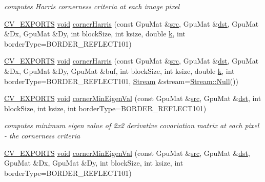\begin{DoxyCompactItemize}
\begin{DoxyCompactList}\small\item\em computes Harris cornerness criteria at each image pixel \end{DoxyCompactList}\item 
\hyperlink{core_2types__c_8h_a1bf9f0e121b54272da02379cfccd0a2b}{C\-V\-\_\-\-E\-X\-P\-O\-R\-T\-S} \hyperlink{legacy_8hpp_a8bb47f092d473522721002c86c13b94e}{void} \hyperlink{namespacecv_1_1gpu_a66cead98ee05fa752d6739124f47ba11}{corner\-Harris} (const Gpu\-Mat \&\hyperlink{legacy_8hpp_a371cd109b74033bc4366f584edd3dacc}{src}, Gpu\-Mat \&\hyperlink{photo__c_8h_aed13e2a25279b24dc954073233fef7a5}{dst}, Gpu\-Mat \&Dx, Gpu\-Mat \&Dy, int block\-Size, int ksize, double \hyperlink{legacy_8hpp_a7be9b6436e5ea72ff5d5a66779b4bd38}{k}, int border\-Type=B\-O\-R\-D\-E\-R\-\_\-\-R\-E\-F\-L\-E\-C\-T101)
\item 
\hyperlink{core_2types__c_8h_a1bf9f0e121b54272da02379cfccd0a2b}{C\-V\-\_\-\-E\-X\-P\-O\-R\-T\-S} \hyperlink{legacy_8hpp_a8bb47f092d473522721002c86c13b94e}{void} \hyperlink{namespacecv_1_1gpu_a495c842da58ec4756c58c004707a3f68}{corner\-Harris} (const Gpu\-Mat \&\hyperlink{legacy_8hpp_a371cd109b74033bc4366f584edd3dacc}{src}, Gpu\-Mat \&\hyperlink{photo__c_8h_aed13e2a25279b24dc954073233fef7a5}{dst}, Gpu\-Mat \&Dx, Gpu\-Mat \&Dy, Gpu\-Mat \&buf, int block\-Size, int ksize, double \hyperlink{legacy_8hpp_a7be9b6436e5ea72ff5d5a66779b4bd38}{k}, int border\-Type=B\-O\-R\-D\-E\-R\-\_\-\-R\-E\-F\-L\-E\-C\-T101, \hyperlink{classcv_1_1gpu_1_1Stream}{Stream} \&stream=\hyperlink{classcv_1_1gpu_1_1Stream_af96c23564834f88333dcb8997df553f1}{Stream\-::\-Null}())
\item 
\hyperlink{core_2types__c_8h_a1bf9f0e121b54272da02379cfccd0a2b}{C\-V\-\_\-\-E\-X\-P\-O\-R\-T\-S} \hyperlink{legacy_8hpp_a8bb47f092d473522721002c86c13b94e}{void} \hyperlink{namespacecv_1_1gpu_a276e83d391b545ae9d7572fd9424df64}{corner\-Min\-Eigen\-Val} (const Gpu\-Mat \&\hyperlink{legacy_8hpp_a371cd109b74033bc4366f584edd3dacc}{src}, Gpu\-Mat \&\hyperlink{photo__c_8h_aed13e2a25279b24dc954073233fef7a5}{dst}, int block\-Size, int ksize, int border\-Type=B\-O\-R\-D\-E\-R\-\_\-\-R\-E\-F\-L\-E\-C\-T101)
\begin{DoxyCompactList}\small\item\em computes minimum eigen value of 2x2 derivative covariation matrix at each pixel -\/ the cornerness criteria \end{DoxyCompactList}\item 
\hyperlink{core_2types__c_8h_a1bf9f0e121b54272da02379cfccd0a2b}{C\-V\-\_\-\-E\-X\-P\-O\-R\-T\-S} \hyperlink{legacy_8hpp_a8bb47f092d473522721002c86c13b94e}{void} \hyperlink{namespacecv_1_1gpu_a6b6dc67d2f32f16d19b8d305bfe6a0fb}{corner\-Min\-Eigen\-Val} (const Gpu\-Mat \&\hyperlink{legacy_8hpp_a371cd109b74033bc4366f584edd3dacc}{src}, Gpu\-Mat \&\hyperlink{photo__c_8h_aed13e2a25279b24dc954073233fef7a5}{dst}, Gpu\-Mat \&Dx, Gpu\-Mat \&Dy, int block\-Size, int ksize, int border\-Type=B\-O\-R\-D\-E\-R\-\_\-\-R\-E\-F\-L\-E\-C\-T101)

\end{DoxyCompactItemize}
